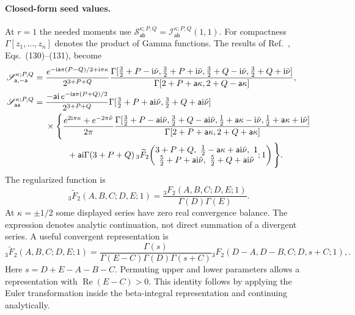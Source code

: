 \documentclass[a4paper,12pt]{article}
\newcommand{\ii}{\mathrm i}
\newcommand{\tn}{\tilde\nu}
\def\aa{\mathsf a}
\newcommand{\bb}{\mathsf b}
\begin{document}
\paragraph{Closed-form seed values.}
At $r=1$ the needed moments use
$\mathscr S_{\aa\bb}^{\kappa;P,Q}
=\mathscr I_{\aa\bb}^{\kappa;P,Q}(1,1)$.
For compactness $\Gamma[z_1,\ldots,z_n]$ denotes the product of
Gamma functions. The results of Ref.~\cite{qin-seed},
Eqs.~(130)--(131), become
\begin{align}
 \mathscr S_{\aa,-\aa}^{\kappa;P,Q}
 ={}&\frac{e^{-\ii \aa\pi(P-Q)/2+\ii\pi\kappa}}{2^{3+P+Q}}
 \frac{\Gamma[\tfrac32+P-\ii\tn,\tfrac32+P+\ii\tn,
               \tfrac32+Q-\ii\tn,\tfrac32+Q+\ii\tn]}
      {\Gamma[2+P+\aa\kappa,2+Q-\aa\kappa]},
 \label{eq:whittaker-opposite}\\
 \mathscr S_{\aa\aa}^{\kappa;P,Q}
 ={}&\frac{-\aa\ii\,e^{-\ii \aa\pi(P+Q)/2}}{2^{3+P+Q}}
 \Gamma[\tfrac32+P+\aa\ii\tn,\tfrac32+Q+\aa\ii\tn]
 \nonumber\\
 &\times\Bigg\{
 \frac{e^{2\ii\pi\kappa}+e^{-2\pi\tn}}{2\pi}
 \frac{\Gamma[\tfrac32+P-\aa\ii\tn,\tfrac32+Q-\aa\ii\tn,
               \tfrac12+\aa\kappa-\ii\tn,\tfrac12+\aa\kappa+\ii\tn]}
      {\Gamma[2+P+\aa\kappa,2+Q+\aa\kappa]}
 \nonumber\\
 &\hspace{9mm}
 +\aa\ii\Gamma(3+P+Q)\,
 {}_3\widetilde F_2\!
 \left(\begin{matrix}3+P+Q,\ \tfrac12-\aa\kappa+\aa\ii\tn,\ 1\\
 \tfrac52+P+\aa\ii\tn,\ \tfrac52+Q+\aa\ii\tn\end{matrix};1\right)
 \Bigg\}.
 \label{eq:whittaker-equal}
\end{align}
The regularized function is
\begin{equation}
 {}_3\widetilde F_2(A,B,C;D,E;1)
 =\frac{{}_3F_2(A,B,C;D,E;1)}{\Gamma(D)\Gamma(E)}.
 \label{eq:regularized-hyper}
\end{equation}
At $\kappa=\pm1/2$ some displayed series have zero real convergence
balance. The expression denotes analytic continuation, not direct
summation of a divergent series. A useful convergent representation is
\begin{equation}
 {}_3\widetilde F_2(A,B,C;D,E;1)
 =\frac{\Gamma(s)}
        {\Gamma(E-C)\Gamma(D)\Gamma(s+C)}
 {}_3F_2(D-A,D-B,C;D,s+C;1),
 .
 \label{eq:whittaker-thomae}
\end{equation}
Here $s=D+E-A-B-C$. Permuting upper and lower parameters allows a representation with
$\operatorname{Re}(E-C)>0$. This identity follows by applying the
Euler transformation inside the beta-integral representation and
continuing analytically.
\end{document}
